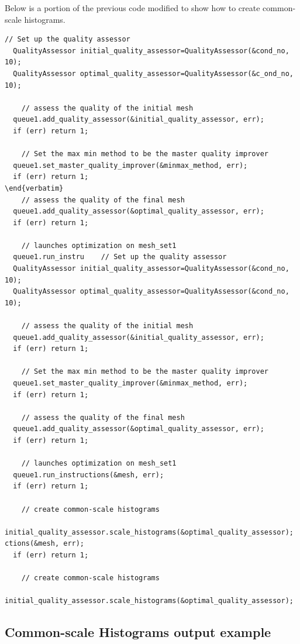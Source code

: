  Below is a portion of the previous code modified to show how to create common-scale histograms.
\begin{lstlisting}[frame=single]
    // Set up the quality assessor
  QualityAssessor initial_quality_assessor=QualityAssessor(&cond_no, 10);
  QualityAssessor optimal_quality_assessor=QualityAssessor(&c_ond_no, 10);

    // assess the quality of the initial mesh
  queue1.add_quality_assessor(&initial_quality_assessor, err);
  if (err) return 1;

    // Set the max min method to be the master quality improver
  queue1.set_master_quality_improver(&minmax_method, err);
  if (err) return 1;
\end{verbatim}
    // assess the quality of the final mesh
  queue1.add_quality_assessor(&optimal_quality_assessor, err);
  if (err) return 1;

    // launches optimization on mesh_set1
  queue1.run_instru    // Set up the quality assessor
  QualityAssessor initial_quality_assessor=QualityAssessor(&cond_no, 10);
  QualityAssessor optimal_quality_assessor=QualityAssessor(&cond_no, 10);

    // assess the quality of the initial mesh
  queue1.add_quality_assessor(&initial_quality_assessor, err);
  if (err) return 1;

    // Set the max min method to be the master quality improver
  queue1.set_master_quality_improver(&minmax_method, err);
  if (err) return 1;

    // assess the quality of the final mesh
  queue1.add_quality_assessor(&optimal_quality_assessor, err);
  if (err) return 1;

    // launches optimization on mesh_set1
  queue1.run_instructions(&mesh, err);
  if (err) return 1;

    // create common-scale histograms
  initial_quality_assessor.scale_histograms(&optimal_quality_assessor);
ctions(&mesh, err);
  if (err) return 1;

    // create common-scale histograms
  initial_quality_assessor.scale_histograms(&optimal_quality_assessor);

\end{lstlisting}

\clearpage
\subsection{Common-scale Histograms output example}

